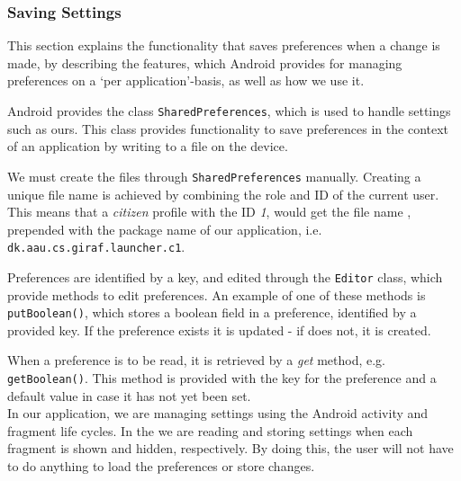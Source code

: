 \subsubsection{Saving Settings}\label{para:sprint4:managingsettingsandroid}
This section explains the functionality that saves preferences when a change is made, by describing the features, which Android provides for managing preferences on a `per application'-basis, as well as how we use it.

Android provides the class \lstinline|SharedPreferences|, which is used to handle settings such as ours.
This class provides functionality to save preferences in the context of an application by writing to a file on the device.

We must create the files through \lstinline|SharedPreferences| manually.
Creating a unique file name is achieved by combining the role and ID of the current user.
This means that a \textit{citizen} profile with the ID \textit{1}, would get the file name , prepended with the package name of our application, i.e. \lstinline|dk.aau.cs.giraf.launcher.c1|.

Preferences are identified by a key, and edited through the \lstinline|Editor| class, which provide methods to edit preferences.
An example of one of these methods is \lstinline!putBoolean()!, which stores a boolean field in a preference, identified by a provided key.
If the preference exists it is updated - if does not, it is created.

When a preference is to be read, it is retrieved by a \textit{get} method, e.g. \lstinline!getBoolean()!.
This method is provided with the key for the preference and a default value in case it has not yet been set.\\

In our application, we are managing settings using the Android activity and fragment life cycles.
In the \settingsactivity we are reading and storing settings when each fragment is shown and hidden, respectively. 
By doing this, the user will not have to do anything to load the preferences or store changes.